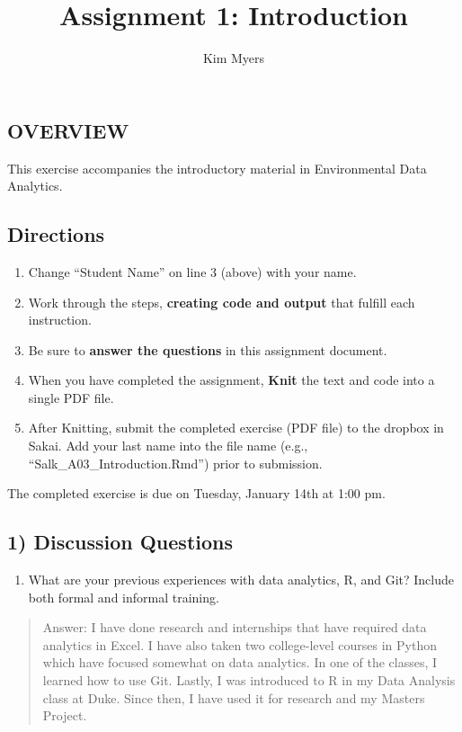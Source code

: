 \documentclass[
]{article}
\title{Assignment 1: Introduction}
\author{Kim Myers}
\date{}
\providecommand{\tightlist}{%
  \setlength{\itemsep}{0pt}\setlength{\parskip}{0pt}}
\begin{document}
\maketitle

\hypertarget{overview}{%
\subsection{OVERVIEW}\label{overview}}

This exercise accompanies the introductory material in Environmental
Data Analytics.

\hypertarget{directions}{%
\subsection{Directions}\label{directions}}

\begin{enumerate}
\def\labelenumi{\arabic{enumi}.}
\tightlist
\item
  Change ``Student Name'' on line 3 (above) with your name.
\item
  Work through the steps, \textbf{creating code and output} that fulfill
  each instruction.
\item
  Be sure to \textbf{answer the questions} in this assignment document.
\item
  When you have completed the assignment, \textbf{Knit} the text and
  code into a single PDF file.
\item
  After Knitting, submit the completed exercise (PDF file) to the
  dropbox in Sakai. Add your last name into the file name (e.g.,
  ``Salk\_A03\_Introduction.Rmd'') prior to submission.
\end{enumerate}

The completed exercise is due on Tuesday, January 14th at 1:00 pm.

\hypertarget{discussion-questions}{%
\subsection{1) Discussion Questions}\label{discussion-questions}}

\begin{enumerate}
\def\labelenumi{\arabic{enumi}.}
\tightlist
\item
  What are your previous experiences with data analytics, R, and Git?
  Include both formal and informal training.
\end{enumerate}

\begin{quote}
Answer: I have done research and internships that have required data
analytics in Excel. I have also taken two college-level courses in
Python which have focused somewhat on data analytics. In one of the
classes, I learned how to use Git. Lastly, I was introduced to R in my
Data Analysis class at Duke. Since then, I have used it for research and
my Masters Project.
\end{quote}
\end{document}
